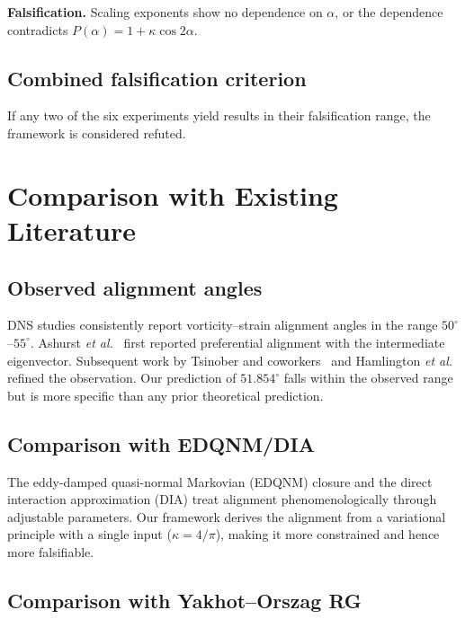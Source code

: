 \documentclass[12pt,a4paper]{article}
\begin{document}
\noindent\textbf{Falsification.}
Scaling exponents show no dependence on $\alpha$, or the dependence contradicts $P(\alpha) = 1 + \kappa\cos 2\alpha$.

\subsection{Combined falsification criterion}

If any two of the six experiments yield results in their falsification range, the framework is considered refuted.

\section{Comparison with Existing Literature}
\label{sec:comparison}

\subsection{Observed alignment angles}

DNS studies consistently report vorticity--strain alignment angles in the range $50^\circ$--$55^\circ$.
Ashurst \emph{et al.}~\cite{Ashurst1987} first reported preferential alignment with the intermediate eigenvector.
Subsequent work by Tsinober and coworkers~\cite{Tsinober1992} and Hamlington \emph{et al.}~\cite{Hamlington2008} refined the observation.
Our prediction of $51.854^\circ$ falls within the observed range but is more specific than any prior theoretical prediction.

\subsection{Comparison with EDQNM/DIA}

The eddy-damped quasi-normal Markovian (EDQNM) closure and the direct interaction approximation (DIA) treat alignment phenomenologically through adjustable parameters.
Our framework derives the alignment from a variational principle with a single input ($\kappa = 4/\pi$), making it more constrained and hence more falsifiable.

\subsection{Comparison with Yakhot--Orszag RG}
\end{document}
